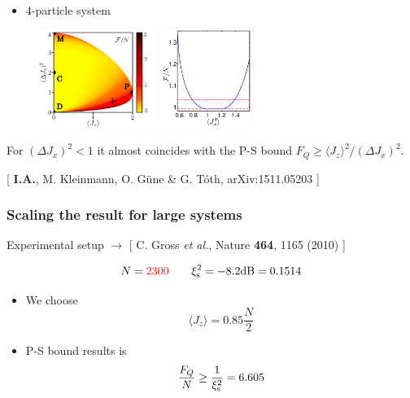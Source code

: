\documentclass{beamer}
\newcommand{\expect}[1]{\ensuremath{\langle #1 \rangle}}
\newcommand{\varian}[1]{\ensuremath{\left(\Delta #1 \right)^2}}
\newcommand{\citate}[1]{{\footnotesize{\color{gray}[ #1 ]}}

	}
\begin{document}
		\begin{frame}
			\begin{itemize}
				\item 4-particle system
			\end{itemize}
			\begin{figure}
				\includegraphics[height=120px]{img/lb-spsq.pdf}
				\hspace{15px}
				\includegraphics[height=120px]{img/4thparameter-spsq.pdf}
			\end{figure}
			For $\varian{J_x}<1$ it almost coincides with the P-S bound $F_Q\geq \expect{J_z}^2/\varian{J_x}$.

			\citate{\textbf{I.A.}, M. Kleinmann, O. G\"une \& G. T\'oth, arXiv:1511.05203}

		\end{frame}

		\begin{frame}
			\frametitle{Scaling the result for large systems}

			{\small Experimental setup $\rightarrow$ \citate{C. Gross {\it et al.}, Nature {\bf 464}, 1165 (2010)}}
				\begin{block}
					{}
					\[
					N = {\color{red}2300}\qquad \xi^2_{\rm s} =-8.2{\rm dB}=0.1514
					\]
				\end{block}
				\begin{itemize}
					\item<2-> We choose
					\[ \expect{J_z} = 0.85 \frac{N}{2}
					\]
					\item<3-> P-S bound results is
					\[
					\frac{F_Q}{N} \geq \frac{1}{\xi_{\rm s}^2} = 6.605
					\]
				\end{itemize}
		\end{frame}
\end{document}
